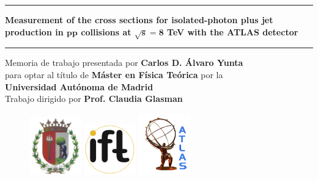 \documentclass[12pt, twoside]{article}
\numberwithin{equation}{section}
\numberwithin{figure}{section}
\newenvironment{changemargin}[2]{%
\begin{list}{}{%
\setlength{\topsep}{0pt}%
\setlength{\leftmargin}{#1}%
\setlength{\rightmargin}{#2}%
\setlength{\listparindent}{\parindent}%
\setlength{\itemindent}{\parindent}%
\setlength{\parsep}{\parskip}%
}%
\item[]}{\end{list}}
\begin{document}
%
%
\pagestyle{headings}
\pagestyle{empty}

\begin{changemargin}{-1cm}{0cm}
    \vspace*{-1.8cm}
    \newcommand{\HRule}{\rule{\linewidth}{1mm}}

    \HRule
    \begin{center}
        \Huge{\textbf{Measurement of the cross sections for isolated-photon plus jet production in $\boldsymbol{pp}$ collisions at $\boldsymbol{\sqrt{s} = 8}$ TeV with the ATLAS detector}}\\[5mm]
    \end{center}
    \HRule

    \vspace{1.2cm}

    \begin{center}
        Memoria de trabajo presentada por \textbf{Carlos D. \'Alvaro Yunta}\\
        para optar al t\'itulo de \textbf{M\'aster en F\'isica Te\'orica} por la\\
        \textbf{Universidad Aut\'onoma de Madrid}\\
        \vspace{0.8cm}
        Trabajo dirigido por \textbf{Prof. Claudia Glasman}
    \end{center}

    \vspace{0.8cm}

    \begin{figure}[ht]
        \centering
        \hbox{\includegraphics[width=0.2\textwidth]{images/logo_UAM.jpg}}
        \hbox{\includegraphics[width=0.2\textwidth]{images/logo_IFT.png}}
        \hbox{\includegraphics[width=0.2\textwidth]{images/logo_ATLAS.png}}


\end{figure}
\end{changemargin}
\end{document}
